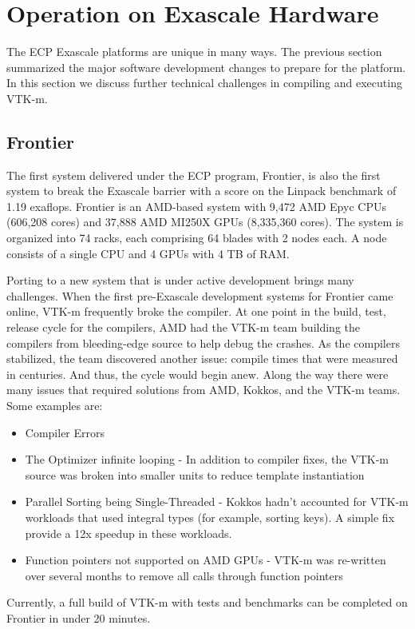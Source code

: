 \section{Operation on Exascale Hardware}

The ECP Exascale platforms are unique in many ways.
The previous section summarized the major software development changes to prepare for the platform.
In this section we discuss further technical challenges in compiling and executing VTK-m.


\subsection{Frontier}
The first system delivered under the ECP program, Frontier, is also the first system to break the Exascale barrier with a score on the Linpack benchmark of 1.19 exaflops. Frontier is an AMD-based system with 9,472 AMD Epyc CPUs (606,208 cores) and 37,888 AMD MI250X GPUs (8,335,360 cores). The system is organized into 74 racks, each comprising 64 blades with 2 nodes each. A node consists of a single CPU and 4 GPUs with 4 TB of RAM.

Porting to a new system that is under active development brings many challenges. When the first pre-Exascale development systems for Frontier came online, VTK-m frequently broke the compiler. At one point in the build, test, release cycle for the compilers, AMD had the VTK-m team building the compilers from bleeding-edge source to help debug the crashes. As the compilers stabilized, the team discovered another issue: compile times that were measured in centuries. And thus, the cycle would begin anew. Along the way there were many issues that required solutions from AMD, Kokkos, and the VTK-m teams. Some examples are:
\begin{itemize}
    \item Compiler Errors
    \item The Optimizer infinite looping - In addition to compiler fixes, the VTK-m source was broken into smaller units to reduce template instantiation
    \item Parallel Sorting being Single-Threaded - Kokkos hadn't accounted for VTK-m workloads that used integral types (for example, sorting keys). A simple fix provide a 12x speedup in these workloads.
    \item Function pointers not supported on AMD GPUs - VTK-m was re-written over several months to remove all calls through function pointers
\end{itemize}
Currently, a full build of VTK-m with tests and benchmarks can be completed on Frontier in under 20 minutes.

